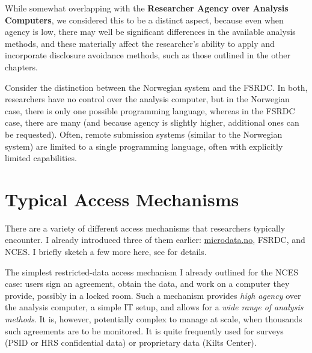 While somewhat overlapping with the \textbf{Researcher Agency over Analysis Computers}, we considered this to be a distinct aspect, because even when agency is low, there may well be significant differences in the available analysis methods, and these materially affect the researcher's ability to apply and incorporate disclosure avoidance methods, such as those outlined in the other chapters. 

Consider the distinction between the Norwegian system and the FSRDC. In both, researchers have no control over the analysis computer, but in the Norwegian case, there is only one possible programming language, whereas in the FSRDC case, there are many (and because agency is slightly higher, additional ones can be requested). Often, remote submission systems (similar to the Norwegian system) are limited to a single programming language, often with explicitly limited capabilities. 

\section{Typical Access Mechanisms}
\label{sec:typical_access}

There are a variety of different access mechanisms that researchers typically encounter. I already introduced three of them earlier: \url{microdata.no}, FSRDC, and NCES.  I briefly sketch a few more here, see \cite{shen_physically_2021} for details. 

The simplest restricted-data access mechanism I already outlined for the NCES case: users sign an agreement, obtain the data, and work on a computer they provide, possibly in a locked room. Such a mechanism provides \textit{high agency} over the analysis computer, a simple IT setup, and allows for a \textit{wide range of analysis methods}. It is, however, potentially complex to manage at scale, when thousands such agreements are to be monitored. It is quite frequently used for surveys (PSID or HRS confidential data) or  proprietary data (Kilts Center). 


